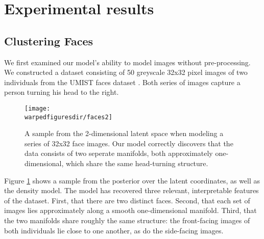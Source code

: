 



\section{Experimental results}

\subsection{Clustering Faces}

We first examined our model's ability to model images without pre-processing.
We constructed a dataset consisting of 50 greyscale 32x32 pixel images of two individuals from the UMIST faces dataset \citep{umistfaces}.
Both series of images capture a person turning his head to the right.

\begin{figure}[ht!]
\centering
\texttt{[image: \\warpedfiguresdir/faces2]}
\caption[Latent clusters of face images]{A sample from the 2-dimensional latent space when modeling a series of 32x32 face images.
Our model correctly discovers that the data consists of two seperate manifolds, both approximately one-dimensional, which share the same head-turning structure.}
\label{fig:faces}
\end{figure}

Figure \ref{fig:faces} shows a sample from the posterior over the latent coordinates, as well as the density model.  The model has recovered three relevant, interpretable features of the dataset.
First, that there are two distinct faces.
Second, that each set of images lies approximately along a smooth one-dimensional manifold.
Third, that the two manifolds share roughly the same structure: the front-facing images of both individuals lie close to one another, as do the side-facing images.


